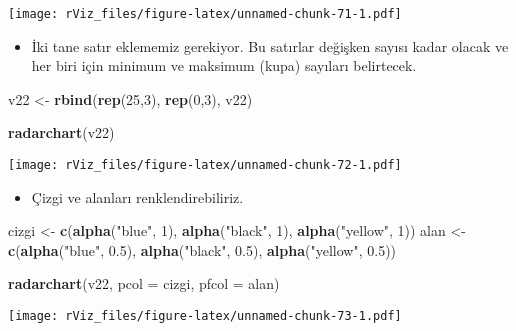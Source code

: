 \documentclass[
]{book}
\newenvironment{Shaded}{\begin{snugshade}}{\end{snugshade}}
\newcommand{\DataTypeTok}[1]{\textcolor[rgb]{0.13,0.29,0.53}{#1}}
\newcommand{\DecValTok}[1]{\textcolor[rgb]{0.00,0.00,0.81}{#1}}
\newcommand{\FloatTok}[1]{\textcolor[rgb]{0.00,0.00,0.81}{#1}}
\newcommand{\KeywordTok}[1]{\textcolor[rgb]{0.13,0.29,0.53}{\textbf{#1}}}
\newcommand{\NormalTok}[1]{#1}
\newcommand{\StringTok}[1]{\textcolor[rgb]{0.31,0.60,0.02}{#1}}
\providecommand{\tightlist}{%
  \setlength{\itemsep}{0pt}\setlength{\parskip}{0pt}}
\begin{document}
\texttt{[image: rViz\_files/figure-latex/unnamed-chunk-71-1.pdf]}

\begin{itemize}
\tightlist
\item
  İki tane satır eklememiz gerekiyor. Bu satırlar değişken sayısı kadar olacak ve her biri için minimum ve maksimum (kupa) sayıları belirtecek.
\end{itemize}

\begin{Shaded}
\begin{Highlighting}[]
\NormalTok{v22 <-}\StringTok{ }\KeywordTok{rbind}\NormalTok{(}\KeywordTok{rep}\NormalTok{(}\DecValTok{25}\NormalTok{,}\DecValTok{3}\NormalTok{), }\KeywordTok{rep}\NormalTok{(}\DecValTok{0}\NormalTok{,}\DecValTok{3}\NormalTok{), v22)}

\KeywordTok{radarchart}\NormalTok{(v22)}
\end{Highlighting}
\end{Shaded}

\texttt{[image: rViz\_files/figure-latex/unnamed-chunk-72-1.pdf]}

\begin{itemize}
\tightlist
\item
  Çizgi ve alanları renklendirebiliriz.
\end{itemize}

\begin{Shaded}
\begin{Highlighting}[]
\NormalTok{cizgi <-}\StringTok{ }\KeywordTok{c}\NormalTok{(}\KeywordTok{alpha}\NormalTok{(}\StringTok{"blue"}\NormalTok{, }\DecValTok{1}\NormalTok{), }\KeywordTok{alpha}\NormalTok{(}\StringTok{"black"}\NormalTok{, }\DecValTok{1}\NormalTok{), }\KeywordTok{alpha}\NormalTok{(}\StringTok{"yellow"}\NormalTok{, }\DecValTok{1}\NormalTok{))}
\NormalTok{alan <-}\StringTok{ }\KeywordTok{c}\NormalTok{(}\KeywordTok{alpha}\NormalTok{(}\StringTok{"blue"}\NormalTok{, }\FloatTok{0.5}\NormalTok{), }\KeywordTok{alpha}\NormalTok{(}\StringTok{"black"}\NormalTok{, }\FloatTok{0.5}\NormalTok{), }\KeywordTok{alpha}\NormalTok{(}\StringTok{"yellow"}\NormalTok{, }\FloatTok{0.5}\NormalTok{))}

\KeywordTok{radarchart}\NormalTok{(v22,}
           \DataTypeTok{pcol =}\NormalTok{ cizgi,}
           \DataTypeTok{pfcol =}\NormalTok{ alan)}
\end{Highlighting}
\end{Shaded}

\texttt{[image: rViz\_files/figure-latex/unnamed-chunk-73-1.pdf]}
\end{document}
